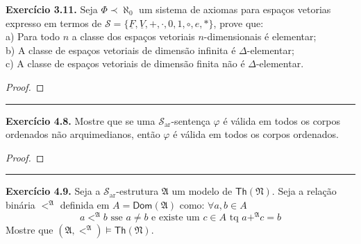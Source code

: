 \documentclass[11pt]{article}
\theoremstyle{definition}
\newcommand{\mc}[1]{\mathcal{#1}}
\newcommand{\mf}[1]{\mathfrak{#1}}
\newcommand{\msf}[1]{\mathsf{#1}}
\begin{document}
\textbf{Exercício 3.11.} Seja $\Phi\prec\aleph_0$ um sistema de axiomas para espaços vetorias expresso em termos de $\mc{S}=\{\underline{F},\underline{V},+,\cdot,0,1,\circ,e,*\}$, prove que:\\
a) Para todo $n$ a classe dos espaços vetoriais $n$-dimensionais é elementar;\\
b) A classe de espaços vetoriais de dimensão infinita é $\Delta$-elementar;\\
c) A classe de espaços vetoriais de dimensão finita não é $\Delta$-elementar.

\begin{proof}
    
\end{proof}

\hrule

\textbf{Exercício 4.8.} Mostre que se uma $\mc{S}_\text{ar}$-sentença $\varphi$ é válida em todos os corpos ordenados não arquimedianos, então $\varphi$ é válida em todos os corpos ordenados.

\begin{proof}
    
\end{proof}

\hrule

\textbf{Exercício 4.9.} Seja a $\mc{S}_\text{ar}$-estrutura $\mf{A}$ um modelo de $\msf{Th}(\mf{N})$. Seja a relação binária $<^\mf{A}$ definida em $A=\msf{Dom}(\mf{A})$ como: $\forall a,b\in A$
$$a<^\mf{A}b\text{ sse }a\ne b\text{ e existe um }c\in A\text{ tq }a+^\mf{A}c=b$$
Mostre que $(\mf{A},<^\mf{A})\vDash\msf{Th}(\mf{N})$.
\end{document}
